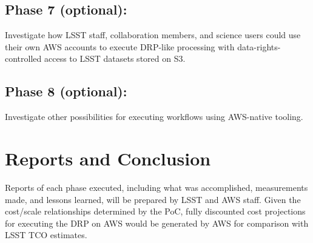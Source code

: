 \subsection{Phase 7 (optional):} \label{sec:phase-7}
Investigate how LSST staff, collaboration members, and science users could use their own AWS accounts to execute DRP-like processing with data-rights-controlled access to LSST datasets stored on S3.

\subsection{Phase 8 (optional):} \label{sec:phase-8}
Investigate other possibilities for executing workflows using AWS-native tooling.

\section{Reports and Conclusion} \label{sec:reports}
Reports of each phase executed, including what was accomplished, measurements made, and lessons learned, will be prepared by LSST and AWS staff. Given the cost/scale relationships determined by the PoC, fully discounted cost projections for executing the DRP on AWS would be generated by AWS for comparison with LSST TCO estimates.
